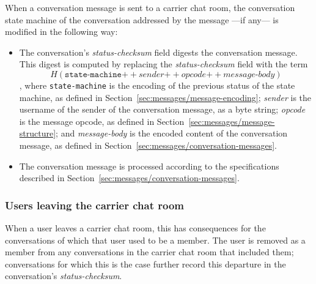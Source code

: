 \documentclass{article}
\def\field#1{\textit{#1}}
\def\smfield#1{\textsl{#1}}
\def\concat{\mathbin{+\!\!\!+}}
\begin{document}
When a conversation message is sent to a carrier chat room, the conversation state machine of the conversation addressed by the message ---if any--- is modified in the following way:
\begin{itemize}
\item The conversation's \smfield{status-checksum} field digests the conversation message. This digest is computed by replacing the \smfield{status-checksum} field with the term
$$H(\texttt{state-machine} \concat \field{sender} \concat \field{opcode} \concat \field{message-body})$$
, where \texttt{state-machine} is the encoding of the previous status of the state machine, as defined in Section~\ref{sec:messages/message-encoding}; \field{sender} is the username of the sender of the conversation message, as a byte string; \field{opcode} is the message opcode, as defined in Section~\ref{sec:messages/message-structure}; and \field{message-body} is the encoded content of the conversation message, as defined in Section~\ref{sec:messages/conversation-messages}.
\item The conversation message is processed according to the specifications described in Section~\ref{sec:messages/conversation-messages}.
\end{itemize}


\subsubsection{Users leaving the carrier chat room}
\label{sec:conversation-state-machine/operations/leaving}

When a user leaves a carrier chat room, this has consequences for the conversations of which that user used to be a member.
The user is removed as a member from any conversations in the carrier chat room that included them; conversations for which this is the case further record this departure in the conversation's \smfield{status-checksum}.
\end{document}

